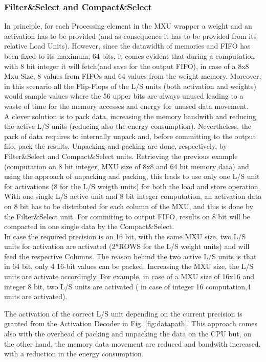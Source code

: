 \subsubsection{Filter\&Select and Compact\&Select}
In principle, for each Processing element in the MXU wrapper a weight and an activation has to be provided (and as consequence it has to be provided from its relative Load Units). However, since the datawidth of memories and FIFO has been fixed to its maximum, 64 bits, it comes evident that during a computation with 8 bit integer it will fetch(and save for the output FIFO), in case of a 8x8 Mxu Size, 8 values from FIFOs and 64 values from the weight memory. Moreover, in this scenario all the Flip-Flops of the L/S units (both activation and weights) would sample values where the 56 upper bits are always unused leading to a waste of time for the memory accesses and energy for unused data movement.\\ A clever solution is to pack data, increasing the memory bandwith and reducing the active L/S units (reducing also the energy consumption). Nevertheless, the pack of data requires to internally unpack and, before committing to the output fifo, pack the results.
Unpacking and packing are done, respectively, by Filter\&Select and Compact\&Select units.
Retrieving the previous example (computation on 8 bit integer, MXU size of 8x8 and 64 bit memory data) and using the approach of unpacking and packing, this leads to  use only one L/S unit for activations (8 for the L/S weigth units) for both the load and store operation. With one single L/S active unit and 8 bit integer computation, an  activation data on 8 bit has to be distributed for each column of the MXU, and this is done by the Filter\&Select unit. For commiting to output FIFO, results on 8 bit will be compacted in one single data by the Compact\&Select.\\

In case the required precision is on 16 bit, with the same MXU size, two L/S units for activation are activated (2*ROWS for the L/S weight units) and will feed the respective Columns. The reason behind the two active L/S units is that in 64 bit, only 4 16-bit values can be packed.
Increasing the MXU size, the L/S units are activate accordingly. For example, in case of a MXU size of 16x16 and integer 8 bit, two L/S units are activated ( in case of integer 16 computation,4 units are activated).

The activation of the correct L/S unit depending on the current precision is granted from the Activation Decoder in Fig. \ref{fig:datapath}.
This approach comes also with the overhead of packing and unpacking the data on the CPU but, on the other hand, the memory data movement are reduced and bandwith increased, with a reduction in the energy consumption.

